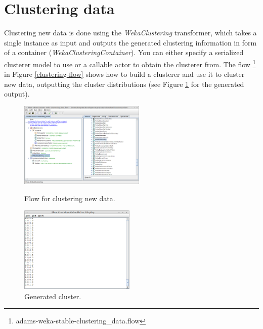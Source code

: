 \section{Clustering data}
Clustering new data is done using the \textit{WekaClustering} transformer, which
takes a single instance as input and outputs the generated clustering
information in form of a container (\textit{WekaClusteringContainer}). You can
either specify a serialized clusterer model to use or a callable actor to obtain
the clusterer from. The flow \footnote{adams-weka-stable-clustering\_data.flow} in
Figure \ref{clustering-flow} shows how to build a clusterer and use it to
cluster new data, outputting the cluster distributions (see Figure
\ref{clustering-output} for the generated output).

\begin{figure}[ht]
  \begin{minipage}[t]{0.5\linewidth}
    \centering
    \includegraphics[width=6.0cm]{images/clustering-flow.png}
    \caption{Flow for clustering new data.}
    \label{clustering-flow}
  \end{minipage}
  \hspace{0.5cm}
  \begin{minipage}[t]{0.5\linewidth}
    \centering
    \includegraphics[width=5.5cm]{images/clustering-output.png}
    \caption{Generated cluster.}
    \label{clustering-output}
  \end{minipage}
\end{figure}
